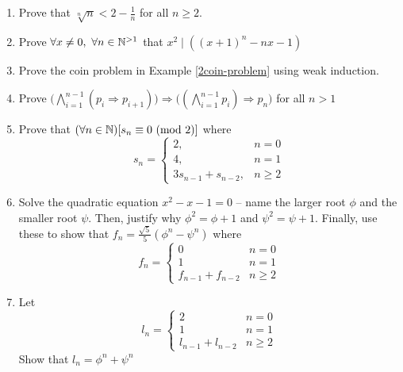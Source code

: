 \documentclass[main.tex]{subfiles}
\begin{document}
\begin{enumerate}
	\item Prove that \(\sqrt[n]{n} < 2 - \frac{1}{n}\) for all \(n \geq 2\).
	\item Prove \(\forall x \neq 0,\ \forall n \in \mathbb{N}^{>1}\) that \(x^2 \mid ((x+1)^n - nx - 1)\)
	\item Prove the coin problem in Example \ref{2coin-problem} using weak induction. %
	\item Prove \(\big(\bigwedge_{i=1}^{n-1} (p_i \Rightarrow p_{i+1})\big) \Rightarrow \big( (\bigwedge_{i=1}^{n-1} p_i) \Rightarrow p_n \big)\) for all \(n > 1\)
	
	\item Prove that \((\forall n \in \mathbb{N})[s_n \equiv 0 \ (\mathrm{mod}\ 2)]\) where \[s_n = \begin{cases} 2, & n = 0 \\ 4, & n = 1 \\ 3s_{n-1} + s_{n-2},& n \geq 2 \end{cases}\]
	\item Solve the quadratic equation \(x^2 - x - 1 = 0\) -- name the larger root \(\phi\) and the smaller root \(\psi\). Then, justify why \(\phi^2 = \phi + 1\) and \(\psi^2 = \psi + 1\). Finally, use these to show that \(f_n = \frac{\sqrt{5}}{5}(\phi^n - \psi^n)\) where \[f_n = \begin{cases} 0 & n=0 \\ 1 & n=1 \\ f_{n-1} + f_{n-2} & n \geq 2 \end{cases}\]
	\item Let \[l_n = \begin{cases} 2 & n=0 \\ 1 & n=1 \\ l_{n-1} + l_{n-2} & n \geq 2 \end{cases}\]
	Show that \(l_n = \phi^n + \psi^n\)
	

\end{enumerate}
\end{document}
